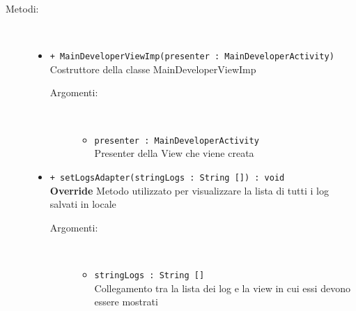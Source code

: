 \documentclass[../DefinizioneDiProdotto.tex]{subfiles}
\begin{document}
\begin{description}
\begin{itemize}
	\end{itemize}
	\item[Metodi:] \
	\begin{itemize}
		\item \texttt{+ MainDeveloperViewImp(presenter : MainDeveloperActivity)}\\
		Costruttore della classe MainDeveloperViewImp
		\begin{description}
			\item[Argomenti:] \
			\begin{itemize}
				\item \texttt{presenter : MainDeveloperActivity}\\
				Presenter della View che viene creata\end{itemize}
		\end{description}
		\item \texttt{+ setLogsAdapter(stringLogs : String []) : void}\\
		\textbf{Override} Metodo utilizzato per visualizzare la lista di tutti i log salvati in locale
		\begin{description}
			\item[Argomenti:] \
			\begin{itemize}
				\item \texttt{stringLogs : String []}\\
				Collegamento tra la lista dei log e la view in cui essi devono essere mostrati\end{itemize}
		\end{description}
	\end{itemize}
\end{description}
\end{document}
